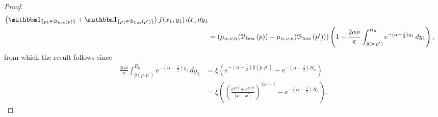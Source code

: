 \begin{proof}
\begin{align*}
		\left(\ind{p_1 \in \BallPon{p}} + \ind{p_1 \in \BallPon{p^\prime}}\right) 
		f(x_1,y_1) \, dx_1 \, dy_1\\
	&= \left(\mu_{\alpha,\nu ,n}(\BallPon{p}) + \mu_{\alpha,\nu ,n}(\BallPon{p^\prime})\right)
		\left(1 - \frac{2\alpha \nu}{\pi}\int_{\hat{y}(p,p^\prime)}^{R_n} e^{-(\alpha - \frac{1}{2})y_1} \, dy_1\right),
\end{align*}
from which the result follows since
\begin{align*}
	\frac{2\alpha \nu}{\pi}\int_{\hat{y}(p,p^\prime)}^{R_n} e^{-(\alpha - \frac{1}{2})y_1} \, dy_1 
	&= \xi\left(e^{-(\alpha - \frac{1}{2})\hat{y}(p,p^\prime)} - e^{-(\alpha - \frac{1}{2})R_n}\right)\\
	&= \xi\left(\left(\frac{e^{y/2} + e^{y^\prime/2}}{|x-x^\prime|}\right)^{2\alpha - 1}
		- e^{-(\alpha - \frac{1}{2})R_n}\right).
\end{align*}
\end{proof}

%	
%	
%	
%    
%    
%    
%    
%    
%    
%    
%    
%    
%    
%    
%    

